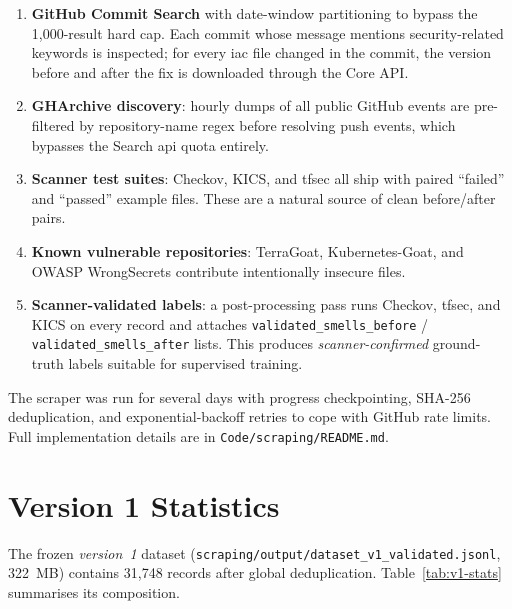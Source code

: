 \documentclass[12pt, a4paper]{report}
\begin{document}
\begin{enumerate}
  \item \textbf{GitHub Commit Search} with date-window partitioning to
        bypass the 1{,}000-result hard cap. Each commit whose message
        mentions security-related keywords is inspected; for every
        \gls{iac} file changed in the commit, the version before and
        after the fix is downloaded through the Core API.
  \item \textbf{GHArchive discovery}: hourly dumps of all public GitHub
        events are pre-filtered by repository-name regex before resolving
        push events, which bypasses the Search \gls{api} quota entirely.
  \item \textbf{Scanner test suites}: Checkov, KICS, and tfsec all ship
        with paired ``failed'' and ``passed'' example files. These are a
        natural source of clean before/after pairs.
  \item \textbf{Known vulnerable repositories}: TerraGoat,
        Kubernetes-Goat, and OWASP WrongSecrets contribute
        intentionally insecure files.
  \item \textbf{Scanner-validated labels}: a post-processing pass runs
        Checkov, tfsec, and KICS on every record and attaches
        \texttt{validated\_smells\_before} / \texttt{validated\_smells\_after}
        lists. This produces \emph{scanner-confirmed} ground-truth labels
        suitable for supervised training.
\end{enumerate}

The scraper was run for several days with progress checkpointing,
SHA-256 deduplication, and exponential-backoff retries to cope with
GitHub rate limits. Full implementation details are in
\texttt{Code/scraping/README.md}.

\section{Version 1 Statistics}

The frozen \emph{version~1} dataset
(\texttt{scraping/output/dataset\_v1\_validated.jsonl}, 322~MB) contains
31{,}748 records after global deduplication. Table~\ref{tab:v1-stats}
summarises its composition.
\end{document}
